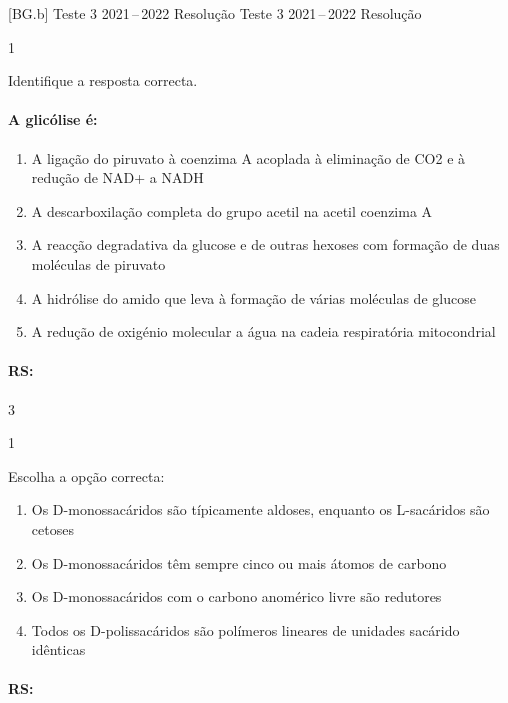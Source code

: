 \documentclass[\mainfilename]{subfiles}
\begin{document}
[BG.b]
{Teste 3 2021\,--\,2022 Resolução}
{Teste 3 2021\,--\,2022 Resolução}

\begin{questionBox}1{} %
    
    Identifique a resposta correcta.

    \paragraph{A glicólise é:}
    \begin{enumerate}
        \item A ligação do  piruvato  à coenzima A  acoplada à eliminação de CO2 e à redução de NAD+ a NADH 
        \item A descarboxilação completa do grupo acetil na acetil coenzima A 
        \item A reacção degradativa da glucose e de outras hexoses com formação de duas moléculas de piruvato 
        \item A hidrólise do amido que leva à formação de várias  moléculas de glucose 
        \item A redução de oxigénio molecular a água  na cadeia respiratória mitocondrial
    \end{enumerate}

    \paragraph{RS:} 3
    
\end{questionBox}

\begin{questionBox}1{} %
    
    Escolha a opção correcta:
    \begin{enumerate}
        \item Os D-monossacáridos  são típicamente aldoses, enquanto os L-sacáridos são cetoses
        \item Os D-monossacáridos  têm sempre cinco ou mais átomos de carbono 
        \item Os D-monossacáridos com o carbono anomérico livre são redutores 
        \item Todos os D-polissacáridos são polímeros lineares de unidades sacárido idênticas 
    \end{enumerate}

    \paragraph{RS:}
    
\end{questionBox}
\end{document}
